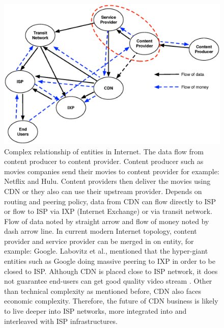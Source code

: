 \documentclass[paper]{ieice}
\begin{document}
\begin{figure}[tb]
\begin{center}
\includegraphics[scale=0.4]{graphs/business-relationship.eps}
\end{center}
\caption{Complex relationship of entities in Internet.
The data flow from content producer to content provider. 
Content producer such as movies companies send their movies to content provider for example: Netflix and Hulu.
Content providers then deliver the movies using CDN or they also can use their upstream provider.
Depends on routing and peering policy, data from CDN can flow directly to ISP or flow to ISP via IXP (Internet Exchange) or via transit network. 
Flow of data noted by straight arrow and flow of money noted by dash arrow line.
In current modern Internet topology, content provider and service provider can be merged in on entity, for example: Google.
Labovitz et al.,\cite{Labovitz:2010:IIT:2043164.1851194} mentioned that the hyper-giant entities such as Google doing massive peering to IXP in order to be closed to ISP. 
Although CDN is placed close to ISP network, it does not guarantee end-users can get good quality video stream \cite{Krishnan:2009:MBE:1644893.1644917}.
Other than technical complexity as mentioned before, CDN also faces economic complexity\cite{dispute}.
Therefore, the future of CDN business is likely to live deeper into ISP networks, more integrated into and interleaved with ISP infrastructures.}
\label{fig:businessrelationship}
\vspace{-2mm}
\end{figure} 
\end{document}
